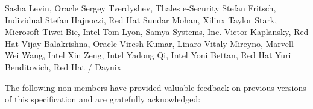 Sasha Levin,	Oracle	\newline
Sergey Tverdyshev,	Thales e-Security	\newline
Stefan Fritsch, Individual \newline
Stefan Hajnoczi,	Red Hat	\newline
Sundar Mohan, Xilinx	\newline
Taylor Stark, Microsoft \newline
Tiwei Bie, Intel \newline
Tom Lyon,	Samya Systems, Inc.	\newline
Victor Kaplansky, Red Hat	\newline
Vijay Balakrishna,	Oracle	\newline
Viresh Kumar, Linaro \newline
Vitaly Mireyno, Marvell \newline
Wei Wang, Intel	\newline
Xin Zeng, Intel	\newline
Yadong Qi, Intel \newline
Yoni Bettan, Red Hat \newline
Yuri Benditovich, Red Hat / Daynix \newline

The following non-members have provided valuable feedback on
previous versions of this
specification and are gratefully acknowledged:

